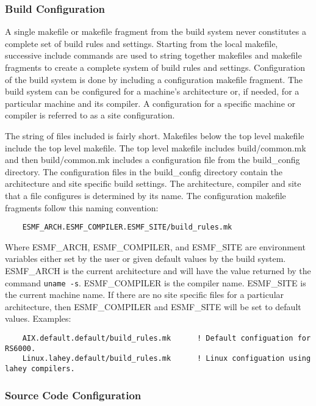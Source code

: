 \subsubsection{Build Configuration}

A single makefile or makefile fragment from the build system never
constitutes a complete set of build rules and settings.  Starting from
the local makefile, successive include commands are used to string
together makefiles and makefile fragments to create a complete system
of build rules and settings.  Configuration of the build system is
done by including a configuration makefile fragment.  The build
system can be configured for a machine's architecture or, if needed,
for a particular machine and its compiler. A configuration for a
specific machine or compiler is referred to as a site configuration.

The string of files included is fairly short.  Makefiles below the top
level makefile include the top level makefile. The top level makefile
includes build/common.mk and then build/common.mk includes a
configuration file from the build\_config directory.  The configuration
files in the build\_config directory contain the architecture and site
specific build settings.  The architecture, compiler and site that a file
configures is determined by its name.  The configuration makefile
fragments follow this naming convention:

\begin{verbatim}
    ESMF_ARCH.ESMF_COMPILER.ESMF_SITE/build_rules.mk
\end{verbatim}

Where ESMF\_ARCH, ESMF\_COMPILER, and ESMF\_SITE are environment
variables either set by the user or given default values by the build
system. ESMF\_ARCH is the current architecture and will have the value
returned by the command {\tt uname -s}.  ESMF\_COMPILER is the compiler
name.  ESMF\_SITE is the current machine name. If there are no site
specific files for a particular architecture, then ESMF\_COMPILER and
ESMF\_SITE will be set to default values.  Examples:

\begin{verbatim}
    AIX.default.default/build_rules.mk      ! Default configuation for RS6000.
    Linux.lahey.default/build_rules.mk      ! Linux configuation using lahey compilers.
\end{verbatim}

\subsubsection{Source Code Configuration}

